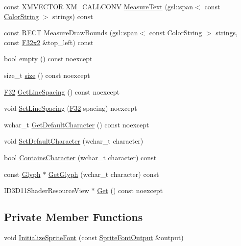 \begin{DoxyCompactItemize}
const X\+M\+V\+E\+C\+T\+OR X\+M\+\_\+\+C\+A\+L\+L\+C\+O\+NV \hyperlink{classmage_1_1rendering_1_1_sprite_font_a56471bbeedfa1982f05bf1b9055f74f1}{Measure\+Text} (gsl\+::span$<$ const \hyperlink{classmage_1_1rendering_1_1_color_string}{Color\+String} $>$ strings) const
\item 
const R\+E\+CT \hyperlink{classmage_1_1rendering_1_1_sprite_font_a661820d3d7b20a797966007cd712a76b}{Measure\+Draw\+Bounds} (gsl\+::span$<$ const \hyperlink{classmage_1_1rendering_1_1_color_string}{Color\+String} $>$ strings, const \hyperlink{namespacemage_aa87237ad091f5cd7da612b8523fc108f}{F32x2} \&top\+\_\+left) const
\item 
bool \hyperlink{classmage_1_1rendering_1_1_sprite_font_acc6d1e6ea5d1cb5ca55154a3f4cdc70e}{empty} () const noexcept
\item 
size\+\_\+t \hyperlink{classmage_1_1rendering_1_1_sprite_font_a4f5191f82d228c41b5b6b1ca8215a4b2}{size} () const noexcept
\item 
\hyperlink{namespacemage_aa97e833b45f06d60a0a9c4fc22ae02c0}{F32} \hyperlink{classmage_1_1rendering_1_1_sprite_font_af8a9229b449007440733cdd65d65b2f5}{Get\+Line\+Spacing} () const noexcept
\item 
void \hyperlink{classmage_1_1rendering_1_1_sprite_font_a0dc7afe54ffa5f2215efc739ba8dc2ed}{Set\+Line\+Spacing} (\hyperlink{namespacemage_aa97e833b45f06d60a0a9c4fc22ae02c0}{F32} spacing) noexcept
\item 
wchar\+\_\+t \hyperlink{classmage_1_1rendering_1_1_sprite_font_af50e0ef59bf9d4be7b402c71609de497}{Get\+Default\+Character} () const noexcept
\item 
void \hyperlink{classmage_1_1rendering_1_1_sprite_font_a7400d0574c96e4e204268d6cd5a5c356}{Set\+Default\+Character} (wchar\+\_\+t character)
\item 
bool \hyperlink{classmage_1_1rendering_1_1_sprite_font_a6f9adb6806acc990ac3feaa547f7f296}{Contains\+Character} (wchar\+\_\+t character) const
\item 
const \hyperlink{structmage_1_1rendering_1_1_glyph}{Glyph} $\ast$ \hyperlink{classmage_1_1rendering_1_1_sprite_font_aa56b305252b14f6ecf51738fccb16e93}{Get\+Glyph} (wchar\+\_\+t character) const
\item 
I\+D3\+D11\+Shader\+Resource\+View $\ast$ \hyperlink{classmage_1_1rendering_1_1_sprite_font_ab24067a24942427a39d88ca042da3484}{Get} () const noexcept
\end{DoxyCompactItemize}
\subsection*{Private Member Functions}
\begin{DoxyCompactItemize}
\item 
void \hyperlink{classmage_1_1rendering_1_1_sprite_font_a832f140b987c30ef8f6a3b95afe52711}{Initialize\+Sprite\+Font} (const \hyperlink{structmage_1_1rendering_1_1_sprite_font_output}{Sprite\+Font\+Output} \&output)
\end{DoxyCompactItemize}
